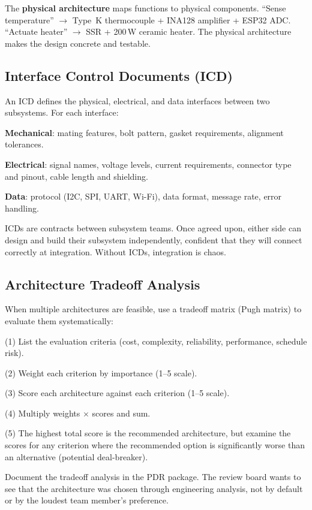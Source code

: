 The \textbf{physical architecture} maps functions to physical components. ``Sense temperature'' $\to$ Type~K thermocouple + INA128 amplifier + ESP32 ADC. ``Actuate heater'' $\to$ SSR + 200\,W ceramic heater. The physical architecture makes the design concrete and testable.

\subsection{Interface Control Documents (ICD)}
An ICD defines the physical, electrical, and data interfaces between two subsystems. For each interface:

\textbf{Mechanical}: mating features, bolt pattern, gasket requirements, alignment tolerances.

\textbf{Electrical}: signal names, voltage levels, current requirements, connector type and pinout, cable length and shielding.

\textbf{Data}: protocol (I2C, SPI, UART, Wi-Fi), data format, message rate, error handling.

ICDs are contracts between subsystem teams. Once agreed upon, either side can design and build their subsystem independently, confident that they will connect correctly at integration. Without ICDs, integration is chaos.

\subsection{Architecture Tradeoff Analysis}
When multiple architectures are feasible, use a tradeoff matrix (Pugh matrix) to evaluate them systematically:

(1) List the evaluation criteria (cost, complexity, reliability, performance, schedule risk).

(2) Weight each criterion by importance (1--5 scale).

(3) Score each architecture against each criterion (1--5 scale).

(4) Multiply weights $\times$ scores and sum.

(5) The highest total score is the recommended architecture, but examine the scores for any criterion where the recommended option is significantly worse than an alternative (potential deal-breaker).

Document the tradeoff analysis in the PDR package. The review board wants to see that the architecture was chosen through engineering analysis, not by default or by the loudest team member's preference.
